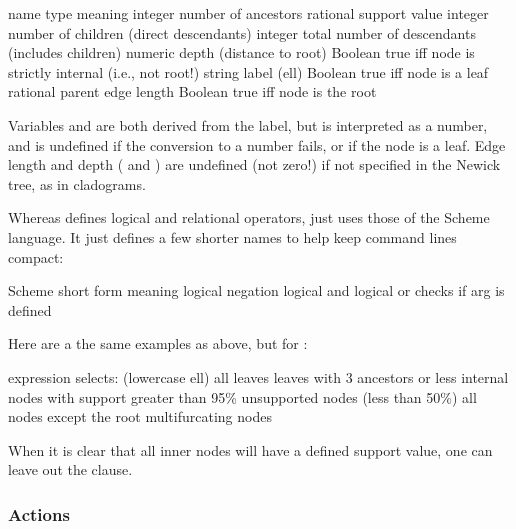 \startalignment[center]
\starttabulate[|c|l|l|]
\NC name \NC type \NC meaning \NC\NR
\HL
\NC {} \NC integer \NC number of ancestors  \NC\NR
\NC {} \NC rational \NC support value \NC\NR
\NC {} \NC integer \NC number of children (direct descendants) \NC\NR
\NC {} \NC integer \NC total number of descendants (includes children) \NC\NR
\NC {} \NC numeric \NC depth (distance to root) \NC\NR
\NC {} \NC Boolean \NC true iff node is strictly internal (i.e., not root!) \NC\NR
\NC {} \NC string \NC label \NC\NR
\NC {} (ell) \NC Boolean \NC true iff node is a leaf \NC\NR
\NC {} \NC rational \NC parent edge length \NC\NR
\NC {} \NC Boolean \NC true iff node is the root \NC\NR
\stoptabulate
\stopalignment

Variables  and  are both derived from the
label, but  is interpreted as a number, and is undefined if the
conversion to a number fails, or if the node is a leaf. Edge length and depth
( and ) are undefined (not zero!) if not specified in the
Newick tree, as in cladograms.

Whereas \ed{} defines logical and relational operators, \sched{} just uses those
of the Scheme language. It just defines a few shorter names to help keep command
lines compact:

\startalignment[center]
\starttabulate[|l|c|l|]
\NC Scheme \NC \sched{} short form \NC meaning \NC\NR
\HL
\NC {} 	\NC \code{!} 	\NC logical negation \NC\NR
\NC {} 	\NC \code{\&} 	\NC logical and \NC\NR
\NC {}  	\NC \code{\|} 	\NC logical or \NC\NR
\NC {} \NC {}	\NC checks if arg is defined  \NC\NR
\stoptabulate
\stopalignment

Here are a the same examples as above, but for \sched:

\startalignment[center]
\starttabulate[|c|l|]
expression \NC selects: \NC\NR
\HL
{} (lowercase ell) \NC all leaves \NC\NR
{} \NC leaves with 3 ancestors or less \NC\NR
{} \NC internal nodes with support greater than 95\% \NC\NR
{} \NC unsupported nodes (less than 50\%) \NC\NR
{} \NC all nodes except the root \NC\NR
{} \NC multifurcating nodes
\stoptabulate
\stopalignment

When it is clear that all inner nodes will have a defined support
value, one can leave out the  clause.

\subsubsection{Actions}

